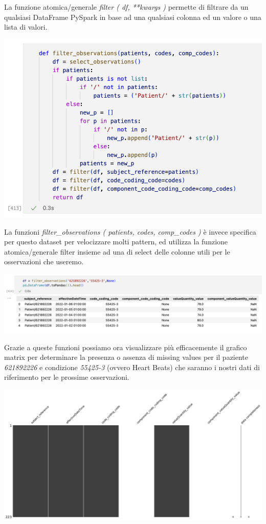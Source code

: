 \documentclass[11pt, oneside]{article}
\begin{document}
La funzione atomica/generale \emph{filter ( df, **kwargs )} permette di filtrare da un qualsiasi DataFrame PySpark in base ad una qualsiasi colonna ed un valore o una lista di valori.

\begin{center}
\includegraphics[scale=0.45]{2_filter_obs.png}
\end{center}

La funzioni \emph{filter\_observations ( patients, codes, comp\_codes )} è invece specifica per questo dataset per velocizzare molti pattern, ed utilizza la funzione atomica/generale filter insieme ad una di select delle colonne utili per le osservazioni che useremo.

\begin{center}
\includegraphics[scale=0.45]{2_filter_obs_df.png}
\end{center}

Grazie a queste funzioni possiamo ora visualizzare più efficacemente il grafico matrix per determinare la presenza o assenza di missing values per il paziente \emph{621892226} e condizione \emph{55425-3} (ovvero Heart Beats) che saranno i nostri dati di riferimento per le prossime osservazioni. 

\begin{center}
\includegraphics[scale=0.25]{2_msn_df.png}
\end{center}
\end{document}
